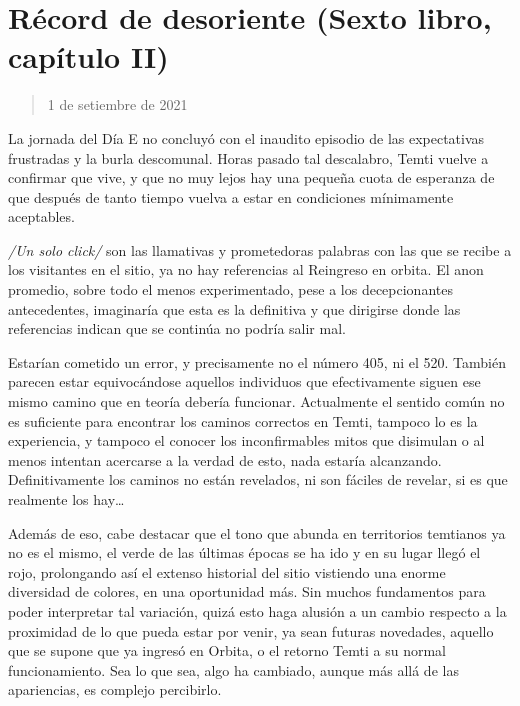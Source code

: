 \documentclass[
  spanish,
]{book}
\begin{document}
\hypertarget{ruxe9cord-de-desoriente-sexto-libro-capuxedtulo-ii}{%
\section{Récord de desoriente (Sexto libro, capítulo II)}\label{ruxe9cord-de-desoriente-sexto-libro-capuxedtulo-ii}}

\begin{quote}
1 de setiembre de 2021
\end{quote}

La jornada del Día E no concluyó con el inaudito episodio de las expectativas frustradas y la burla descomunal. Horas pasado tal descalabro, Temti vuelve a confirmar que vive, y que no muy lejos hay una pequeña cuota de esperanza de que después de tanto tiempo vuelva a estar en condiciones mínimamente aceptables.

\emph{/Un solo click/} son las llamativas y prometedoras palabras con las que se recibe a los visitantes en el sitio, ya no hay referencias al Reingreso en orbita. El anon promedio, sobre todo el menos experimentado, pese a los decepcionantes antecedentes, imaginaría que esta es la definitiva y que dirigirse donde las referencias indican que se continúa no podría salir mal.

Estarían cometido un error, y precisamente no el número 405, ni el 520. También parecen estar equivocándose aquellos individuos que efectivamente siguen ese mismo camino que en teoría debería funcionar. Actualmente el sentido común no es suficiente para encontrar los caminos correctos en Temti, tampoco lo es la experiencia, y tampoco el conocer los inconfirmables mitos que disimulan o al menos intentan acercarse a la verdad de esto, nada estaría alcanzando. Definitivamente los caminos no están revelados, ni son fáciles de revelar, si es que realmente los hay\ldots{}

Además de eso, cabe destacar que el tono que abunda en territorios temtianos ya no es el mismo, el verde de las últimas épocas se ha ido y en su lugar llegó el rojo, prolongando así el extenso historial del sitio vistiendo una enorme diversidad de colores, en una oportunidad más. Sin muchos fundamentos para poder interpretar tal variación, quizá esto haga alusión a un cambio respecto a la proximidad de lo que pueda estar por venir, ya sean futuras novedades, aquello que se supone que ya ingresó en Orbita, o el retorno Temti a su normal funcionamiento. Sea lo que sea, algo ha cambiado, aunque más allá de las apariencias, es complejo percibirlo.
\end{document}
